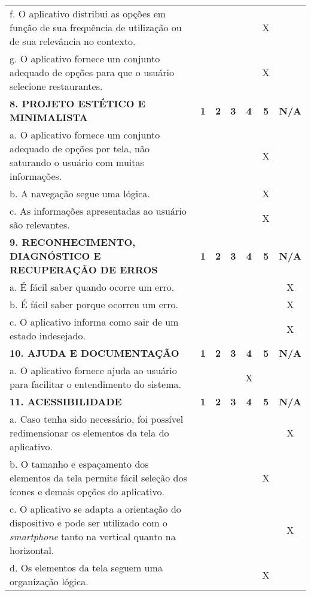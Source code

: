 \documentclass[portuguese,oneside]{tcc}
\begin{document}
\begin{center}
\begin{longtabu}{|L{25em}|c|c|c|c|c|c|}
f. O aplicativo distribui as opções em função de sua frequência de utilização ou de sua relevância no contexto.	& & & & & X & \\ 
g. O aplicativo fornece um conjunto adequado de opções para que o usuário selecione restaurantes. & & & & & X & \\ 
\textbf{8. PROJETO ESTÉTICO E MINIMALISTA} & \textbf{1} & \textbf{2} & \textbf{3} & \textbf{4} & \textbf{5} & \textbf{N/A} \\ 
a. O aplicativo fornece um conjunto adequado de opções por tela, não saturando o usuário com muitas informações. & & & & & X & \\ 
b. A navegação segue uma lógica. & & & & & X & \\ 
c. As informações apresentadas ao usuário são relevantes. & & & & & X & \\ 
\textbf{9. RECONHECIMENTO, DIAGNÓSTICO E RECUPERAÇÃO DE ERROS} & \textbf{1} & \textbf{2} & \textbf{3} & \textbf{4} & \textbf{5} & \textbf{N/A} \\ 
a. É fácil saber quando ocorre um erro.	& & & & & & X \\ 
b. É fácil saber porque ocorreu um erro. & & & & & & X \\ 
c. O aplicativo informa como sair de um estado indesejado. & & & & & & X \\ 
\textbf{10. AJUDA E DOCUMENTAÇÃO} & \textbf{1} & \textbf{2} & \textbf{3} & \textbf{4} & \textbf{5} & \textbf{N/A} \\ 
a. O aplicativo fornece ajuda ao usuário para facilitar o entendimento do sistema. & & & & X & & \\ 
\textbf{11. ACESSIBILIDADE} & \textbf{1} & \textbf{2} & \textbf{3} & \textbf{4} & \textbf{5} & \textbf{N/A} \\ 
a. Caso tenha sido necessário, foi possível redimensionar os elementos da tela do aplicativo. & & & & & & X \\ 
b. O tamanho e espaçamento dos elementos da tela permite fácil seleção dos ícones e demais opções do aplicativo. & & & & & X & \\ 
c. O aplicativo se adapta a orientação do dispositivo e pode ser utilizado com o \emph{smartphone} tanto na vertical quanto na horizontal. & & & & & & X \\ 
d. Os elementos da tela seguem uma organização lógica. & & & & & X & \\ 

\end{longtabu}
\end{center}
\end{document}
